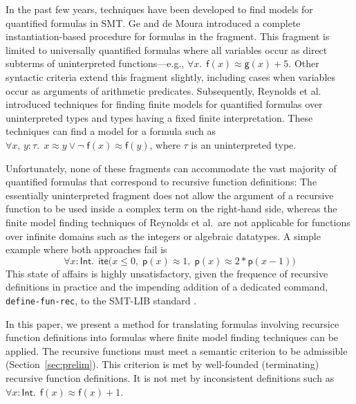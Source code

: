 \documentclass[runningheads,a4paper]{llncs}
\newcommand{\con}[1]{\mathsf{#1}}
\let\oldneg=\neg
\def\neg{\oldneg\;}
\let\oldvee=\vee
\def\vee{\mathrel{\oldvee}}
\newcommand{\teq}{\approx}
\newcommand{\typeint}{\ty{Int}}
\newcommand\ty[1]{\con{#1}}
\newcommand{\lite}{\con{ite}}
\newcommand{\vthinspace}{\kern+0.083333em}
\newcommand{\typ}[1]{^{\vthinspace #1}}
\begin{document}
In the past few years, techniques have been developed to find models for
quantified formulas in SMT.
Ge and de Moura \cite{GeDeM-CAV-09} introduced a complete instantiation-based
procedure for formulas in the  fragment.
This fragment is limited to universally quantified formulas where all
variables occur as direct subterms of uninterpreted
functions---e.g., $\forall x%
.\;\, \con{f}( x )
\teq \con{g}( x ) + 5$.
Other syntactic criteria extend
this fragment slightly, including cases when variables occur as arguments of
arithmetic predicates. Subsequently, Reynolds et al.\
\cite{ReyEtAl-1-RR-13,reynolds-et-al-2013} introduced techniques for finding finite
models for quantified
formulas over uninterpreted types and types having a fixed finite
interpretation. %
These techniques can
find a model for a formula such as $\forall x,\, y : \tau.\;\, x \teq
y \vee \allowbreak \neg \con{f}( x ) \teq \con{f}( y )$, where $\tau$ is an uninterpreted type.

Unfortunately, none of these fragments can accommodate the vast majority of
quantified formulas that correspond to recursive function definitions: The
essentially uninterpreted fragment does not allow the argument of a
recursive function to be used inside a complex term on the right-hand side,
whereas the finite model finding techniques of Reynolds et al.\ are not
applicable for functions over infinite domains such as the integers or
algebraic datatypes. A simple example where both approaches fail is
\begin{equation}\label{eq:pii}
\forall x : {\typeint}.\;\, \lite\bigl(
x \leq 0,\allowbreak\; \con{p}( x ) \teq 1,\allowbreak\; \con{p}( x ) \teq 2 * \con{p}( x - 1 ) \bigr)
\end{equation}
This state of affairs is highly unsatisfactory, given the frequence of
recursive definitions in practice and the impending addition of a dedicated
command, \texttt{define-fun-rec}, to the SMT-LIB standard \cite{smtlib25}.

In this paper, we present a method for translating formulas involving recursice function
definitions into formulas where finite model finding techniques can be applied.
The recursive functions must meet a semantic criterion to be admissible
(Section~\ref{sec:prelim}). This criterion is met by well-founded (terminating)
recursive function definitions. It is not met by inconsistent
definitions such as $\forall x : {\typeint}.\;\, \con{f}(x) \teq \con{f}(x) +
1$. %
\end{document}
